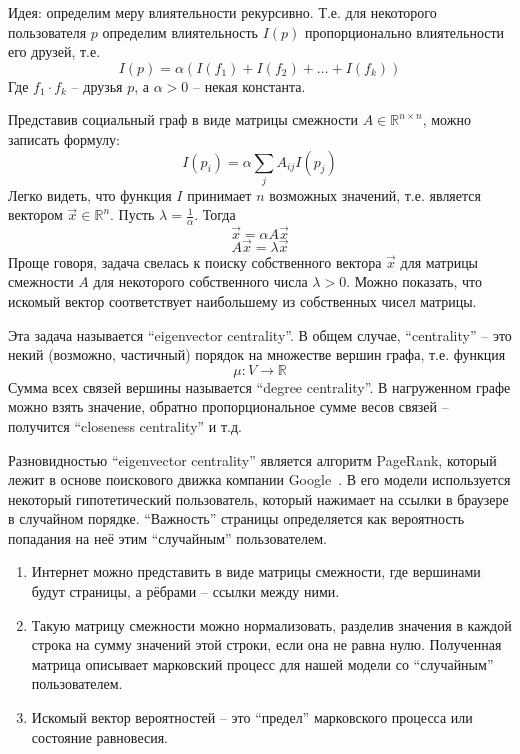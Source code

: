 \documentclass[a4paper,11pt]{article}
\begin{document}
Идея: определим меру влиятельности рекурсивно. Т.е. для некоторого пользователя
$p$ определим влиятельность $I(p)$ пропорционально влиятельности его друзей, т.е.
\begin{equation*}
  I(p) = \alpha (I(f_1) + I(f_2) + \ldots + I(f_k))
\end{equation*}
Где $f_1 \cdot f_k$ -- друзья $p$, а $\alpha > 0$ -- некая константа.

Представив социальный граф в виде матрицы смежности 
$A \in \mathbb{R}^{n \times n}$, можно записать формулу:
\begin{equation*}
  I(p_i) = \alpha \sum_{j} A_{ij} I(p_j)
\end{equation*}
Легко видеть, что функция $I$ принимает $n$ возможных значений, т.е. является
вектором $\vec{x} \in \mathbb{R}^n$. Пусть $\lambda = \frac{1}{\alpha}$. Тогда
\begin{equation*}
  \vec{x} = \alpha A \vec{x}
\end{equation*}
\begin{equation*}
  A \vec{x} = \lambda \vec{x}
\end{equation*}
Проще говоря, задача свелась к поиску собственного вектора $\vec{x}$ для матрицы
смежности $A$ для некоторого собственного числа $\lambda > 0$. Можно показать,
что искомый вектор соответствует наибольшему из собственных чисел матрицы.

Эта задача называется ``eigenvector centrality''. В общем случае, ``centrality''
-- это некий (возможно, частичный) порядок на множестве вершин графа, т.е.
функция 
\begin{equation*}
  \mu: V \rightarrow \mathbb{R}
\end{equation*}
Сумма всех связей вершины называется ``degree centrality''. В нагруженном
графе можно взять значение, обратно пропорциональное сумме весов связей --
получится ``closeness centrality'' и т.д.

Разновидностью ``eigenvector centrality'' является алгоритм PageRank,
который лежит в основе поискового движка компании 
Google~\cite{Page99thepagerank}. В его модели используется некоторый 
гипотетический пользователь, который нажимает на ссылки в браузере в 
случайном порядке. ``Важность'' страницы определяется как вероятность попадания
на неё этим ``случайным'' пользователем.
\begin{enumerate}
\item Интернет можно представить в виде матрицы смежности, где вершинами
  будут страницы, а рёбрами -- ссылки между ними.
\item Такую матрицу смежности можно нормализовать, разделив значения в
  каждой строка на сумму значений этой строки, если она не равна нулю.
  Полученная матрица описывает марковский процесс для нашей модели
  со ``случайным'' пользователем.
\item Искомый вектор вероятностей -- это ``предел'' марковского процесса
  или состояние равновесия.
\end{enumerate}
\end{document}
